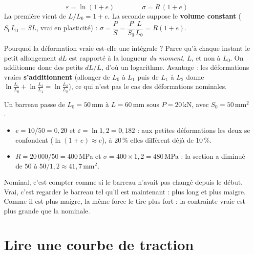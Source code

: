 \begin{thmbox}[title=Passer de l'une à l'autre (à connaître par c\oe ur)]
\[ \varepsilon = \ln(1 + e) \qquad\qquad \sigma = R\,(1 + e) \]
La première vient de $L/L_0 = 1 + e$. La seconde suppose le \textbf{volume constant}
($S_0 L_0 = S L$, vrai en plasticité) : $\sigma = \dfrac{P}{S} = \dfrac{P}{S_0}\dfrac{L}{L_0} = R(1+e)$.
\end{thmbox}

Pourquoi la déformation vraie est-elle une intégrale ? Parce qu'à chaque instant le petit
allongement $dL$ est rapporté à la longueur \emph{du moment}, $L$, et non à $L_0$. On additionne
donc des petits $dL/L$, d'où un logarithme. Avantage : les déformations vraies
\textbf{s'additionnent} (allonger de $L_0$ à $L_1$ puis de $L_1$ à $L_2$ donne
$\ln\frac{L_1}{L_0} + \ln\frac{L_2}{L_1} = \ln\frac{L_2}{L_0}$), ce qui n'est pas le cas des
déformations nominales.

\begin{exbox}[title={Exemple chiffré (pas dans les diapositives)}]
Un barreau passe de $L_0 = 50$\,mm à $L = 60$\,mm sous $P = 20$\,kN, avec $S_0 = 50\,\text{mm}^2$.
\begin{itemize}
  \item $e = 10/50 = 0{,}20$ et $\varepsilon = \ln 1{,}2 = 0{,}182$ : aux petites déformations
        les deux se confondent ($\ln(1+e) \approx e$), à 20\,\% elles diffèrent déjà de 10\,\%.
  \item $R = 20\,000/50 = 400$\,MPa et $\sigma = 400 \times 1{,}2 = 480$\,MPa : la section a
        diminué de $50$ à $50/1{,}2 \approx 41{,}7\,\text{mm}^2$.
\end{itemize}
\end{exbox}


\begin{goatbox}
Nominal, c'est compter comme si le barreau n'avait pas changé depuis le début. Vrai, c'est
regarder le barreau tel qu'il est maintenant : plus long et plus maigre. Comme il est plus
maigre, la même force le tire plus fort : la contrainte vraie est plus grande que la nominale.
\end{goatbox}

\section{Lire une courbe de traction}

